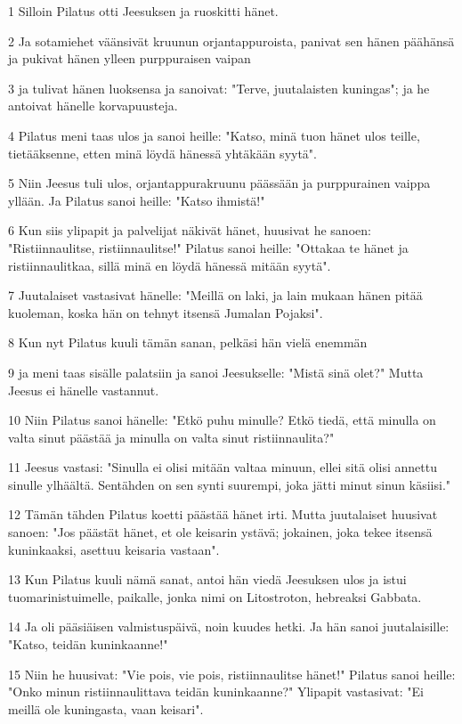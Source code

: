 \par 1 Silloin Pilatus otti Jeesuksen ja ruoskitti hänet.
\par 2 Ja sotamiehet väänsivät kruunun orjantappuroista, panivat sen hänen päähänsä ja pukivat hänen ylleen purppuraisen vaipan
\par 3 ja tulivat hänen luoksensa ja sanoivat: "Terve, juutalaisten kuningas"; ja he antoivat hänelle korvapuusteja.
\par 4 Pilatus meni taas ulos ja sanoi heille: "Katso, minä tuon hänet ulos teille, tietääksenne, etten minä löydä hänessä yhtäkään syytä".
\par 5 Niin Jeesus tuli ulos, orjantappurakruunu päässään ja purppurainen vaippa yllään. Ja Pilatus sanoi heille: "Katso ihmistä!"
\par 6 Kun siis ylipapit ja palvelijat näkivät hänet, huusivat he sanoen: "Ristiinnaulitse, ristiinnaulitse!" Pilatus sanoi heille: "Ottakaa te hänet ja ristiinnaulitkaa, sillä minä en löydä hänessä mitään syytä".
\par 7 Juutalaiset vastasivat hänelle: "Meillä on laki, ja lain mukaan hänen pitää kuoleman, koska hän on tehnyt itsensä Jumalan Pojaksi".
\par 8 Kun nyt Pilatus kuuli tämän sanan, pelkäsi hän vielä enemmän
\par 9 ja meni taas sisälle palatsiin ja sanoi Jeesukselle: "Mistä sinä olet?" Mutta Jeesus ei hänelle vastannut.
\par 10 Niin Pilatus sanoi hänelle: "Etkö puhu minulle? Etkö tiedä, että minulla on valta sinut päästää ja minulla on valta sinut ristiinnaulita?"
\par 11 Jeesus vastasi: "Sinulla ei olisi mitään valtaa minuun, ellei sitä olisi annettu sinulle ylhäältä. Sentähden on sen synti suurempi, joka jätti minut sinun käsiisi."
\par 12 Tämän tähden Pilatus koetti päästää hänet irti. Mutta juutalaiset huusivat sanoen: "Jos päästät hänet, et ole keisarin ystävä; jokainen, joka tekee itsensä kuninkaaksi, asettuu keisaria vastaan".
\par 13 Kun Pilatus kuuli nämä sanat, antoi hän viedä Jeesuksen ulos ja istui tuomarinistuimelle, paikalle, jonka nimi on Litostroton, hebreaksi Gabbata.
\par 14 Ja oli pääsiäisen valmistuspäivä, noin kuudes hetki. Ja hän sanoi juutalaisille: "Katso, teidän kuninkaanne!"
\par 15 Niin he huusivat: "Vie pois, vie pois, ristiinnaulitse hänet!" Pilatus sanoi heille: "Onko minun ristiinnaulittava teidän kuninkaanne?" Ylipapit vastasivat: "Ei meillä ole kuningasta, vaan keisari".
